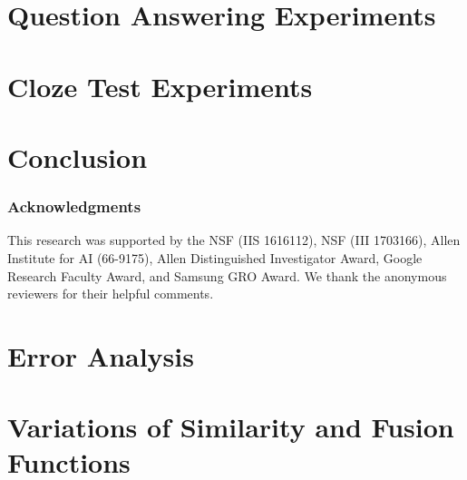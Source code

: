 \documentclass{article} %
\begin{document}
\section{Question Answering Experiments}\label{sec:squad}


\section{Cloze Test Experiments}\label{sec:cnn}



\section{Conclusion}


\subsubsection*{Acknowledgments}
This research was supported by the NSF (IIS 1616112), NSF (III 1703166), Allen Institute for AI (66-9175), Allen Distinguished Investigator Award, Google Research Faculty Award, and Samsung GRO Award. We thank the anonymous reviewers for their helpful comments.

\newpage



\newpage
\appendix
\section{Error Analysis}\label{sec:error}


\section{Variations of Similarity and Fusion Functions}\label{app:var}


% 
\end{document}
